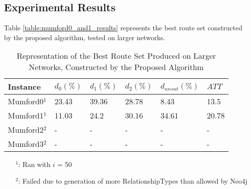 \subsection{Experimental Results}
\label{subsec:scalabilityExperiments_results}


Table \vref{table:mumford0_and1_results} represents the best route set constructed by the proposed algorithm, tested on larger networks.

\begin{table}[H]
    \centering
    \hspace*{-1.0cm}
    \begin{tabular}{|l|l|l|l|l|l|}
        \hline
        Instance & $d_0(\%)$ & $d_1(\%)$ & $d_2(\%)$ & $d_{unsat}(\%)$ & $ATT$\\
        \hline
        Mumford0$^1$ & 23.43 & 39.36 & 28.78 & 8.43 & 13.5\\
        Mumford1$^1$ & 11.03 & 24.2 & 30.16 & 34.61 & 20.78\\
        Mumford2$^2$ & - & - & - & - & - \\
        Mumford3$^2$ & - & - & - & - & - \\
        \hline
    \end{tabular}
    \caption{Representation of the Best Route Set Produced on Larger Networks, Constructed by the Proposed Algorithm}
    \tiny
    \begin{itemize}[noitemsep]
    \item[$^1$:] Ran with $i$ = 50
    \item[$^2$:] Failed due to generation of more RelationshipTypes than allowed by Neo4j
    \end{itemize}
    \label{table:mumford0_and1_results}
\end{table}

